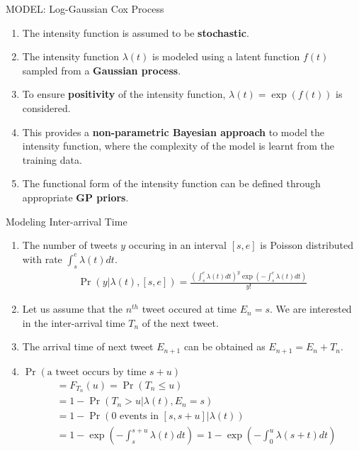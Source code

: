 \documentclass{beamer}
\providecommand{\pr}[1]{\ensuremath{\Pr\left(#1\right)}}
\providecommand{\sbrak}[1]{\ensuremath{{}\left[#1\right]}}
\providecommand{\brak}[1]{\ensuremath{\left(#1\right)}}
\begin{document}
\begin{frame}{MODEL: Log-Gaussian Cox Process}
\begin{enumerate}
    \item The intensity function is assumed to be \textbf{stochastic}.
    \item The intensity function $\lambda \brak t$ is modeled using a latent function $f\brak t $ sampled from a \textbf{Gaussian process}.
    \item To ensure \textbf{positivity} of the intensity function, $\lambda \brak t = \exp\brak{f\brak t}$ is considered.
    \item This provides a \textbf{non-parametric Bayesian approach} to model the intensity function, where the complexity of the model is learnt from the training data.
    \item The functional form of the intensity function can be defined through appropriate \textbf{GP priors}.
\end{enumerate}
\end{frame}

\begin{frame}{Modeling Inter-arrival Time}
    \begin{enumerate}
    \item The number of tweets $y$ occuring in an interval \sbrak{s,e} is Poisson distributed with rate $\int_s^e \lambda\brak t dt$.
    \begin{align}
        \pr{y|\lambda\brak t, \sbrak{s,e}} = \frac{\brak{\int_s^e \lambda\brak t dt}^y \exp\brak{{-\int_s^e \lambda\brak t dt}}}{y!}\label{eq:IPP}
    \end{align}
    \item Let us assume that the $n^{th}$ tweet occured at time $E_n = s$. We are interested in the inter-arrival time $T_n$ of the next tweet.
    \item The arrival time of next tweet $E_{n+1}$ can be obtained as $E_{n+1} = E_n + T_n$.
    \item $\pr{\text{a tweet occurs by time } s + u}$
    \begin{align}
        &=F_{T_n}\brak u= \pr{T_n\le u} \\
        &= 1 - \pr{T_n > u |\lambda\brak t, E_n = s}\\
        &= 1 - \pr{0 \text{ events in }\sbrak{s, s+u}|\lambda\brak t}\\
        &= 1 - \exp\brak{-\int_s^{s+u} \lambda \brak t dt}
        = 1 - \exp\brak{-\int_0^{u} \lambda \brak {s+t} dt}\label{eq: cdf}
    \end{align}
    \end{enumerate}
\end{frame}
\end{document}
